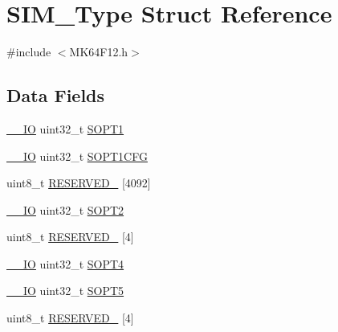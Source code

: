\hypertarget{struct_s_i_m___type}{}\section{S\+I\+M\+\_\+\+Type Struct Reference}
\label{struct_s_i_m___type}


{\ttfamily \#include $<$M\+K64\+F12.\+h$>$}

\subsection*{Data Fields}
\begin{DoxyCompactItemize}
\item 
\mbox{\hyperlink{core__cm4_8h_aec43007d9998a0a0e01faede4133d6be}{\+\_\+\+\_\+\+IO}} uint32\+\_\+t \mbox{\hyperlink{group___v_r_e_f___peripheral___access___layer_ga2dd2ae7d066d4b4240fe56f72f0f7095}{S\+O\+P\+T1}}
\item 
\mbox{\hyperlink{core__cm4_8h_aec43007d9998a0a0e01faede4133d6be}{\+\_\+\+\_\+\+IO}} uint32\+\_\+t \mbox{\hyperlink{group___v_r_e_f___peripheral___access___layer_gae691410c960f357d63ab3b479cb59641}{S\+O\+P\+T1\+C\+FG}}
\item 
uint8\+\_\+t \mbox{\hyperlink{group___v_r_e_f___peripheral___access___layer_gae7904b8fe3af1def40d58c2ca8123e44}{R\+E\+S\+E\+R\+V\+E\+D\+\_}} \mbox{[}4092\mbox{]}
\item 
\mbox{\hyperlink{core__cm4_8h_aec43007d9998a0a0e01faede4133d6be}{\+\_\+\+\_\+\+IO}} uint32\+\_\+t \mbox{\hyperlink{group___v_r_e_f___peripheral___access___layer_ga3f8dc2ae265d799ec159ccd2c2fddabd}{S\+O\+P\+T2}}
\item 
uint8\+\_\+t \mbox{\hyperlink{group___v_r_e_f___peripheral___access___layer_ga422ac2beba1cc5c797380d1c5832b885}{R\+E\+S\+E\+R\+V\+E\+D\+\_}} \mbox{[}4\mbox{]}
\item 
\mbox{\hyperlink{core__cm4_8h_aec43007d9998a0a0e01faede4133d6be}{\+\_\+\+\_\+\+IO}} uint32\+\_\+t \mbox{\hyperlink{group___v_r_e_f___peripheral___access___layer_ga5e152370dc7f083dff49c4e56e669435}{S\+O\+P\+T4}}
\item 
\mbox{\hyperlink{core__cm4_8h_aec43007d9998a0a0e01faede4133d6be}{\+\_\+\+\_\+\+IO}} uint32\+\_\+t \mbox{\hyperlink{group___v_r_e_f___peripheral___access___layer_gad3423d05c1b61a09639d9ea8b5d3ea66}{S\+O\+P\+T5}}
\item 
uint8\+\_\+t \mbox{\hyperlink{group___v_r_e_f___peripheral___access___layer_gacc19a07675d1806592b3ed4a92f91e1c}{R\+E\+S\+E\+R\+V\+E\+D\+\_}} \mbox{[}4\mbox{]}

\end{DoxyCompactItemize}
